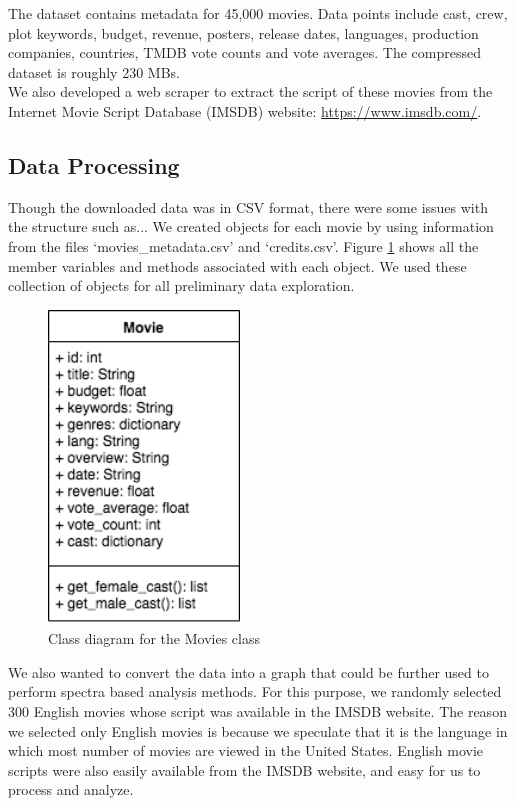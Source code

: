 \documentclass[12pt]{article}
\begin{document}
The dataset contains metadata for 45,000 movies. Data points include cast, crew, plot keywords, budget, revenue, posters, release dates, languages, production companies, countries, TMDB vote counts and vote averages. The compressed dataset is roughly 230 MBs. \\

We also developed a web scraper to extract the script of these movies from the Internet Movie Script Database (IMSDB) website: \url{https://www.imsdb.com/}.

\subsection{Data Processing}
Though the downloaded data was in CSV format, there were some issues with the structure such as... We created objects for each movie by using information from the files `movies\_metadata.csv' and `credits.csv'. Figure \ref{movie} shows all the member variables and methods associated with each object. We used these collection of objects for all preliminary data exploration. \\

\begin{figure}[H]
\begin{center}
\includegraphics[width=2in]{movie_class_diagram.png}
\end{center}
\caption{Class diagram for the Movies class}
\label{movie}
\end{figure}

We also wanted to convert the data into a graph that could be further used to perform spectra based analysis methods. For this purpose, we randomly selected 300 English movies whose script was available in the IMSDB website. The reason we selected only English movies is because we speculate that it is the language in which most number of movies are viewed in the United States. English movie scripts were also easily available from the IMSDB website, and easy for us to process and analyze.\\
\end{document}
